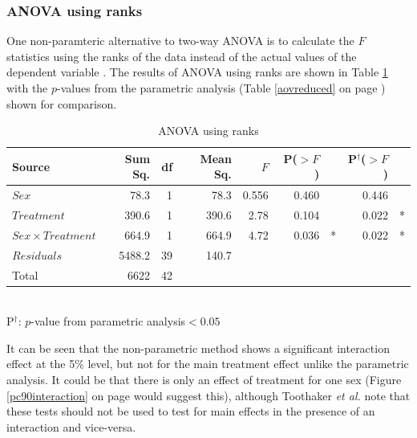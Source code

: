\subsubsection*{ANOVA using ranks}
One non-paramteric alternative to two-way ANOVA is to calculate the $F$ statistics using the ranks of the data instead of the actual values of the dependent variable \cite{conover}. The results of ANOVA using ranks are shown in Table \ref{aovranks} with the $p$-values from the parametric analysis (Table \ref{aovreduced} on page \pageref{aovreduced}) shown for comparison.
\begin{table}[h]
\centering
\caption{ANOVA using ranks}\label{aovranks}
\begin{tabular}{l|rrrrrl|rl}
Source&Sum Sq.&df&Mean Sq.&$F$&P($>F$)&&P$^{\dag}$($>F$)\\
\hline
$Sex$				& 78.3 & 1 & 78.3 & 0.556 &  0.460 && 0.446& \\
$Treatment$			& 390.6   & 1 & 390.6   & 2.78 & 0.104&  & 0.022&* \\
$Sex\times Treatment$	& 664.9   & 1 & 664.9   & 4.72 & 0.036&*   & 0.022&* \\
$Residuals$			& 5488.2 & 39 & 140.7 &&&&\\
\hline
Total&6622&42&&&&
\end{tabular}\\
P$^{\dag}$: $p$-value from parametric analysis\qquad*$<0.05$
\end{table}

It can be seen that the non-parametric method shows a significant interaction effect at the 5\% level, but not for the main treatment effect unlike the parametric analysis. It could be that there is only an effect of treatment for one sex (Figure \ref{pc90interaction} on page \pageref{pc90interaction} would suggest this), although Toothaker \textit{et al.} \cite{toothaker} note that these tests should not be used to test for main effects in the presence of an interaction and vice-versa.

